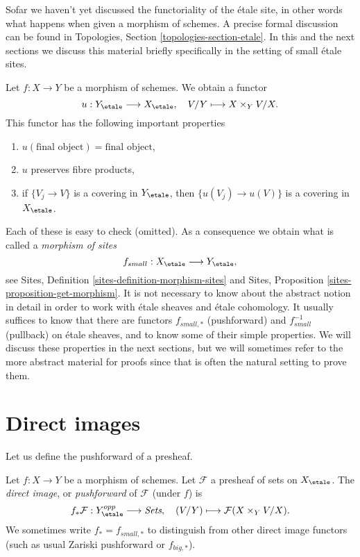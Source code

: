 \noindent
Sofar we haven't yet discussed the functoriality of the \'etale site, in
other words what happens when given a morphism of schemes. A precise formal
discussion can be found in
Topologies, Section \ref{topologies-section-etale}.
In this and the next sections we discuss this material briefly specifically
in the setting of small \'etale sites.

\medskip\noindent
Let $f : X \to Y$ be a morphism of schemes. We obtain a functor
\begin{equation}
\label{equation-functorial}
u : Y_\etale \longrightarrow X_\etale, \quad
V/Y \longmapsto X \times_Y V/X.
\end{equation}
This functor has the following important properties
\begin{enumerate}
\item $u(\text{final object}) = \text{final object}$,
\item $u$ preserves fibre products,
\item if $\{V_j \to V\}$ is a covering in $Y_\etale$, then
$\{u(V_j) \to u(V)\}$ is a covering in $X_\etale$.
\end{enumerate}
Each of these is easy to check (omitted). As a consequence we obtain what
is called a {\it morphism of sites}
$$
f_{small} : X_\etale \longrightarrow Y_\etale,
$$
see
Sites, Definition \ref{sites-definition-morphism-sites}
and
Sites, Proposition \ref{sites-proposition-get-morphism}.
It is not necessary to know about the abstract notion in detail
in order to work with \'etale sheaves and \'etale cohomology.
It usually suffices to know that there are functors
$f_{small, *}$ (pushforward) and $f_{small}^{-1}$ (pullback)
on \'etale sheaves, and to know some of their simple properties.
We will discuss these properties in the next sections, but we will
sometimes refer to the more abstract material for proofs since
that is often the natural setting to prove them.


\section{Direct images}
\label{section-direct-image}

\noindent
Let us define the pushforward of a presheaf.

\begin{definition}
\label{definition-direct-image-presheaf}
Let $f: X\to Y$ be a morphism of schemes.
Let $\mathcal{F} $ a presheaf of sets on $X_\etale$.
The {\it direct image}, or {\it pushforward} of $\mathcal{F}$
(under $f$) is
$$
f_*\mathcal{F} : Y_\etale^{opp} \longrightarrow \textit{Sets}, \quad
(V/Y) \longmapsto \mathcal{F}(X \times_Y V/X).
$$
We sometimes write $f_* = f_{small, *}$ to distinguish from other
direct image functors (such as usual Zariski pushforward or $f_{big, *}$).
\end{definition}

